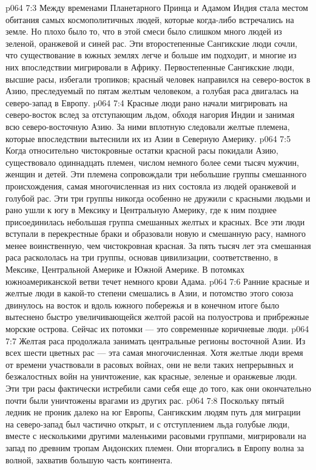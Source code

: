 \vs p064 7:3 Между временами Планетарного Принца и Адамом Индия стала местом обитания самых космополитичных людей, которые когда\hyp{}либо встречались на земле. Но плохо было то, что в этой смеси было слишком много людей из зеленой, оранжевой и синей рас. Эти второстепенные Сангикские люди сочли, что существование в южных землях легче и больше им подходит, и многие из них впоследствии мигрировали в Африку. Первостепенные Сангикские люди, высшие расы, избегали тропиков; красный человек направился на северо\hyp{}восток в Азию, преследуемый по пятам желтым человеком, а голубая раса двигалась на северо\hyp{}запад в Европу.
\vs p064 7:4 Красные люди рано начали мигрировать на северо\hyp{}восток вслед за отступающим льдом, обходя нагория Индии и занимая всю северо\hyp{}восточную Азию. За ними вплотную следовали желтые племена, которые впоследствии вытеснили их из Азии в Северную Америку.
\vs p064 7:5 Когда относительно чистокровные остатки красной расы покидали Азию, существовало одиннадцать племен, числом немного более семи тысяч мужчин, женщин и детей. Эти племена сопровождали три небольшие группы смешанного происхождения, самая многочисленная из них состояла из людей оранжевой и голубой рас. Эти три группы никогда особенно не дружили с красными людьми и рано ушли к югу в Мексику и Центральную Америку, где к ним позднее присоединилась небольшая группа смешанных желтых и красных. Все эти люди вступали в перекрестные браки и образовали новую и смешанную расу, намного менее воинственную, чем чистокровная красная. За пять тысяч лет эта смешанная раса раскололась на три группы, основав цивилизации, соответственно, в Мексике, Центральной Америке и Южной Америке. В потомках южноамериканской ветви течет немного крови Адама.
\vs p064 7:6 Ранние красные и желтые люди в какой\hyp{}то степени смешались в Азии, и потомство этого союза двинулось на восток и вдоль южного побережья и в конечном итоге было вытеснено быстро увеличивающейся желтой расой на полуострова и прибрежные морские острова. Сейчас их потомки --- это современные коричневые люди.
\vs p064 7:7 Желтая раса продолжала занимать центральные регионы восточной Азии. Из всех шести цветных рас --- эта самая многочисленная. Хотя желтые люди время от времени участвовали в расовых войнах, они не вели таких непрерывных и безжалостных войн на уничтожение, как красные, зеленые и оранжевые люди. Эти три расы фактически истребили сами себя еще до того, как они окончательно почти были уничтожены врагами из других рас.
\vs p064 7:8 Поскольку пятый ледник не проник далеко на юг Европы, Сангикским людям путь для миграции на северо\hyp{}запад был частично открыт, и с отступлением льда голубые люди, вместе с несколькими другими маленькими расовыми группами, мигрировали на запад по древним тропам Андонских племен. Они вторгались в Европу волна за волной, захватив большую часть континента.
